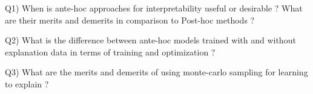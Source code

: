 
Q1) When is ante-hoc approaches for interpretability useful or desirable ?  What are their merits and demerits in comparison to Post-hoc methods ?

Q2) What is the difference between ante-hoc models trained with and without explanation data in terms of training and optimization ?

Q3) What are the merits and demerits of using monte-carlo sampling for learning to explain ?